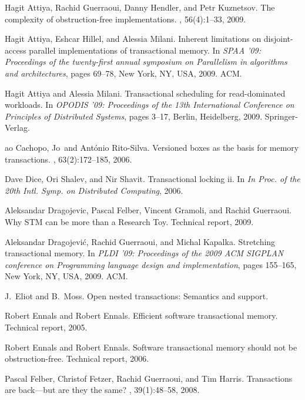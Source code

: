 \begin{thebibliography}{99}
{
Hagit Attiya, Rachid Guerraoui, Danny Hendler, and Petr Kuznetsov.
\newblock The complexity of obstruction-free implementations.
, 56(4):1--33, 2009.

Hagit Attiya, Eshcar Hillel, and Alessia Milani.
\newblock Inherent limitations on disjoint-access parallel implementations of
  transactional memory.
\newblock In {\em SPAA '09: Proceedings of the twenty-first annual symposium on
  Parallelism in algorithms and architectures}, pages 69--78, New York, NY,
  USA, 2009. ACM.

Hagit Attiya and Alessia Milani.
\newblock Transactional scheduling for read-dominated workloads.
\newblock In {\em OPODIS '09: Proceedings of the 13th International Conference
  on Principles of Distributed Systems}, pages 3--17, Berlin, Heidelberg, 2009.
  Springer-Verlag.

{a}o Cachopo, Jo\ and Ant\'{o}nio Rito-Silva.
\newblock Versioned boxes as the basis for memory transactions.
, 63(2):172--185, 2006.

Dave Dice, Ori Shalev, and Nir Shavit.
\newblock Transactional locking ii.
\newblock In {\em In Proc. of the 20th Intl. Symp. on Distributed Computing},
  2006.

Aleksandar Dragojevic, Pascal Felber, Vincent Gramoli, and Rachid Guerraoui.
\newblock Why {STM} can be more than a {R}esearch {T}oy.
\newblock Technical report, 2009.

Aleksandar Dragojevi\'{c}, Rachid Guerraoui, and Michal Kapalka.
\newblock Stretching transactional memory.
\newblock In {\em PLDI '09: Proceedings of the 2009 ACM SIGPLAN conference on
  Programming language design and implementation}, pages 155--165, New York,
  NY, USA, 2009. ACM.

J.~Eliot and B.~Moss.
\newblock Open nested transactions: Semantics and support.

Robert Ennals and Robert Ennals.
\newblock Efficient software transactional memory.
\newblock Technical report, 2005.

Robert Ennals and Robert Ennals.
\newblock Software transactional memory should not be obstruction-free.
\newblock Technical report, 2006.

Pascal Felber, Christof Fetzer, Rachid Guerraoui, and Tim Harris.
\newblock Transactions are back---but are they the same?
, 39(1):48--58, 2008.

}
\end{thebibliography}
